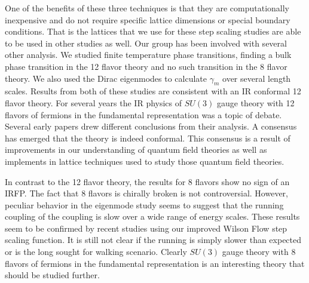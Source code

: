 One of the benefits of these three techniques is that they are computationally inexpensive and do not require specific lattice dimensions or special boundary conditions.
That is the lattices that we use for these step scaling studies are able to be used in other studies as well.
Our group has been involved with several other analysis.
We studied finite temperature phase transitions, finding a bulk phase transition in the 12 flavor theory and no such transition in the 8 flavor theory.
We also used the Dirac eigenmodes to calculate $\gamma_m$ over several length scales.
Results from both of these studies are consistent with an IR conformal 12 flavor theory.
For several years the IR physics of $SU(3)$ gauge theory with 12 flavors of fermions in the fundamental representation was a topic of debate.
Several early papers \cite{} drew different conclusions from their analysis.
A consensus has emerged that the theory is indeed conformal.
This consensus is a result of improvements in our understanding of quantum field theories as well as implements in lattice techniques used to study those quantum field theories.

In contrast to the 12 flavor theory, the results for 8 flavors show no sign of an IRFP.
The fact that 8 flavors is chirally broken is not controversial.
However, peculiar behavior in the eigenmode study seems to suggest that the running coupling of the coupling is slow over a wide range of energy scales.
These results seem to be confirmed by recent studies using our improved Wilson Flow step scaling function.
It is still not clear if the running is simply slower than expected or is the long sought for walking scenario.
Clearly $SU(3)$ gauge theory with 8 flavors of fermions in the fundamental representation is an interesting theory that should be studied further.

